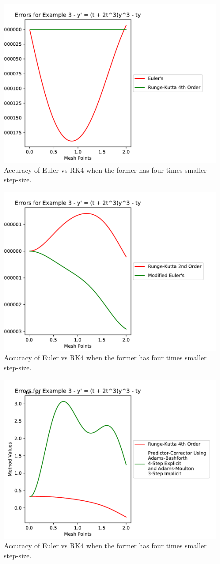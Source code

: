 \documentclass[11pt]{article}	%
\begin{document}


\begin{figure}
\centering
\includegraphics[width=.5\textwidth]{euler_rk4_3}
\caption{Accuracy of Euler vs RK4 when the former has four times smaller step-size.}
\label{fig:euler_rk4_3}
\end{figure}

\begin{figure}
\centering
\includegraphics[width=.5\textwidth]{rk2_meuler_3}
\caption{Accuracy of Euler vs RK4 when the former has four times smaller step-size.}
\label{fig:rk2_meuler_3}
\end{figure}

\begin{figure}
\centering
\includegraphics[width=.5\textwidth]{rk4_predictor_3}
\caption{Accuracy of Euler vs RK4 when the former has four times smaller step-size.}
\label{fig:rk4_predictor_3}
\end{figure}
\end{document}
